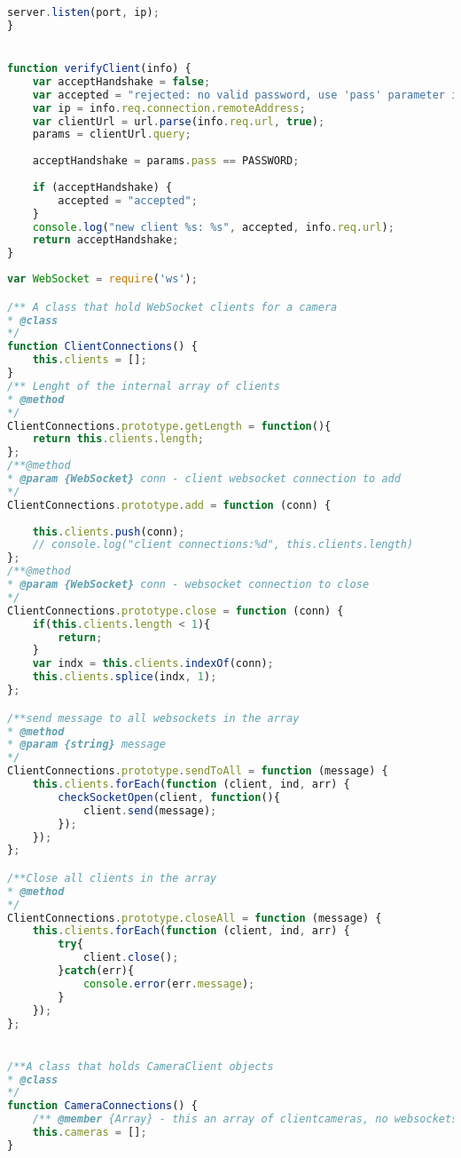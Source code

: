 \documentclass[hidelinks,11pt,a4paper,oneside,article]{memoir}
\begin{document}
\begin{lstlisting}[label={listing:nodejsmain},caption={Main file},language=JavaScript, style=styleprogramming]
    server.listen(port, ip);
}


function verifyClient(info) {
    var acceptHandshake = false;
    var accepted = "rejected: no valid password, use 'pass' parameter in the handshake please";
    var ip = info.req.connection.remoteAddress;
    var clientUrl = url.parse(info.req.url, true);
    params = clientUrl.query;
    
    acceptHandshake = params.pass == PASSWORD;
    
    if (acceptHandshake) {
        accepted = "accepted";
    }
    console.log("new client %s: %s", accepted, info.req.url);
    return acceptHandshake;
}
\end{lstlisting}

\begin{lstlisting}[label={listing:nodejsimplementation},caption={implementation of server-side classes},language=JavaScript, style=styleprogramming]
var WebSocket = require('ws');

/** A class that hold WebSocket clients for a camera
* @class
*/
function ClientConnections() {
    this.clients = [];
}
/** Lenght of the internal array of clients
* @method
*/
ClientConnections.prototype.getLength = function(){
    return this.clients.length;
};
/**@method
* @param {WebSocket} conn - client websocket connection to add
*/
ClientConnections.prototype.add = function (conn) {
    
    this.clients.push(conn);
    // console.log("client connections:%d", this.clients.length)
};
/**@method
* @param {WebSocket} conn - websocket connection to close
*/
ClientConnections.prototype.close = function (conn) {
    if(this.clients.length < 1){
        return;
    }
    var indx = this.clients.indexOf(conn);
    this.clients.splice(indx, 1);
};

/**send message to all websockets in the array
* @method
* @param {string} message 
*/
ClientConnections.prototype.sendToAll = function (message) {
    this.clients.forEach(function (client, ind, arr) {
        checkSocketOpen(client, function(){
            client.send(message);
        });
    });
};

/**Close all clients in the array
* @method
*/
ClientConnections.prototype.closeAll = function (message) {
    this.clients.forEach(function (client, ind, arr) {
        try{
            client.close();
        }catch(err){
            console.error(err.message);
        }
    });
};


/**A class that holds CameraClient objects
* @class
*/
function CameraConnections() {
    /** @member {Array} - this an array of clientcameras, no websockets connections */
    this.cameras = [];
}


\end{lstlisting}
\end{document}
